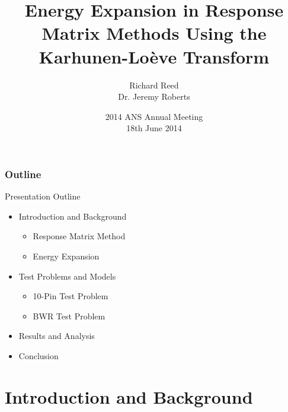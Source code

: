 \documentclass[fleqn]{beamer}
\title[Energy Expansion using KLT]{
  Energy Expansion in Response Matrix Methods Using the Karhunen-Lo\`{e}ve Transform}
\author[Richard Reed]{
  Richard Reed \\
  Dr. Jeremy Roberts}
\institute[Kansas State University]{
  Mechanical and Nuclear Engineering \\
  Kansas State University}
\date[2014 ANS Annual Meeting]{
  2014 ANS Annual Meeting \\
  18th June 2014}
\begin{document}
  \newcommand{\beginbackup}{
    \newcounter{framenumbervorappendix}
    \setcounter{framenumbervorappendix}{\value{framenumber}}
  }
  \newcommand{\backupend}{
    \addtocounter{framenumbervorappendix}{-\value{framenumber}}
    \addtocounter{framenumber}{\value{framenumbervorappendix}}
  }

  \begin{frame}
    \titlepage
  \end{frame}

  \begin{frame}
    \frametitle{Outline}
    \begin{block}{Presentation Outline}
      \begin{itemize}
	\item Introduction and Background
	\begin{itemize}
	  \item Response Matrix Method
	  \item Energy Expansion
	\end{itemize}
	\item Test Problems and Models
	\begin{itemize}
	  \item 10-Pin Test Problem
	  \item BWR Test Problem
	\end{itemize}
	\item Results and Analysis
	\item Conclusion
      \end{itemize}
    \end{block}
  \end{frame}

  \section{Introduction and Background}

\end{document}
